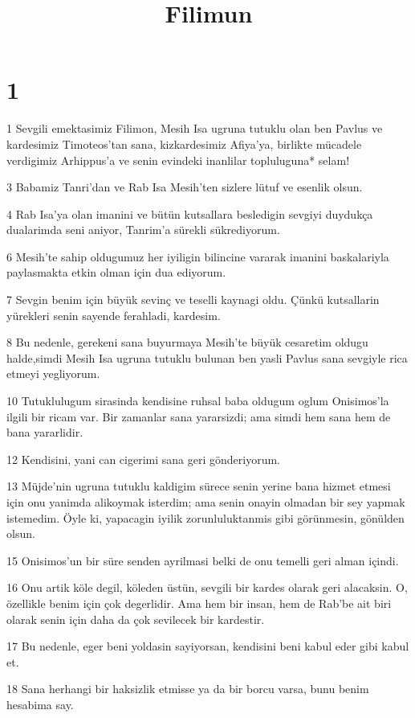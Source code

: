 

\title{Filimun}


\chapter{1}

\par 1 Sevgili emektasimiz Filimon, Mesih Isa ugruna tutuklu olan ben Pavlus ve kardesimiz Timoteos'tan sana, kizkardesimiz Afiya'ya, birlikte mücadele verdigimiz Arhippus'a ve senin evindeki inanlilar topluluguna* selam!
\par 3 Babamiz Tanri'dan ve Rab Isa Mesih'ten sizlere lütuf ve esenlik olsun.
\par 4 Rab Isa'ya olan imanini ve bütün kutsallara besledigin sevgiyi duydukça dualarimda seni aniyor, Tanrim'a sürekli sükrediyorum.
\par 6 Mesih'te sahip oldugumuz her iyiligin bilincine vararak imanini baskalariyla paylasmakta etkin olman için dua ediyorum.
\par 7 Sevgin benim için büyük sevinç ve teselli kaynagi oldu. Çünkü kutsallarin yürekleri senin sayende ferahladi, kardesim.
\par 8 Bu nedenle, gerekeni sana buyurmaya Mesih'te büyük cesaretim oldugu halde,simdi Mesih Isa ugruna tutuklu bulunan ben yasli Pavlus sana sevgiyle rica etmeyi yegliyorum.
\par 10 Tutuklulugum sirasinda kendisine ruhsal baba oldugum oglum Onisimos'la ilgili bir ricam var. Bir zamanlar sana yararsizdi; ama simdi hem sana hem de bana yararlidir.
\par 12 Kendisini, yani can cigerimi sana geri gönderiyorum.
\par 13 Müjde'nin ugruna tutuklu kaldigim sürece senin yerine bana hizmet etmesi için onu yanimda alikoymak isterdim; ama senin onayin olmadan bir sey yapmak istemedim. Öyle ki, yapacagin iyilik zorunluluktanmis gibi görünmesin, gönülden olsun.
\par 15 Onisimos'un bir süre senden ayrilmasi belki de onu temelli geri alman içindi.
\par 16 Onu artik köle degil, köleden üstün, sevgili bir kardes olarak geri alacaksin. O, özellikle benim için çok degerlidir. Ama hem bir insan, hem de Rab'be ait biri olarak senin için daha da çok sevilecek bir kardestir.
\par 17 Bu nedenle, eger beni yoldasin sayiyorsan, kendisini beni kabul eder gibi kabul et.
\par 18 Sana herhangi bir haksizlik etmisse ya da bir borcu varsa, bunu benim hesabima say.
